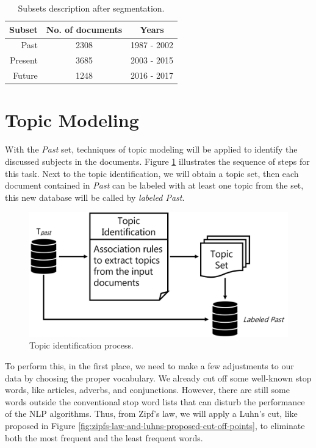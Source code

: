 \begin{table}[h!]
	\centering
	\caption{Subsets description after segmentation.}
	\label{tab:database-description}
	\begin{tabular}{r|cc}
		\toprule
		 Subset & No. of documents &    Years    \\ \midrule
		   Past &       2308       & 1987 - 2002 \\
		Present &       3685       & 2003 - 2015 \\
		 Future &       1248       & 2016 - 2017 \\ \bottomrule
	\end{tabular}
\end{table}

\section{Topic Modeling}

With the \textit{Past} set, techniques of topic modeling will be applied to identify the discussed subjects in the documents. Figure \ref{fig:topic-identification} illustrates the sequence of steps for this task. Next to the topic identification, we will obtain a topic set, then each document contained in \textit{Past} can be labeled with at least one topic from the set, this new database will be called by \textit{labeled Past}.

\begin{figure}[h!]
	\centering
	\includegraphics[width=0.8\linewidth]{01.Chapters/04.Materials/topic-identification}
	\caption{Topic identification process.}
	\label{fig:topic-identification}
\end{figure}

To perform this, in the first place, we need to make a few adjustments to our data by choosing the proper vocabulary. We already cut off some well-known stop words, like articles, adverbs, and conjunctions. However, there are still some words outside the conventional stop word lists that can disturb the performance of the NLP algorithms. Thus, from Zipf's law, we will apply a Luhn's cut, like proposed in Figure \ref{fig:zipfs-law-and-luhns-proposed-cut-off-points}, to eliminate both the most frequent and the least frequent words.

